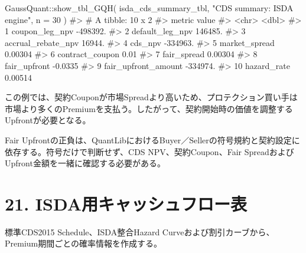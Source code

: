 \documentclass[
  letterpaper,
  DIV=11,
  numbers=noendperiod]{scrreprt}
\newenvironment{Shaded}{\begin{snugshade}}{\end{snugshade}}
\newcommand{\AttributeTok}[1]{\textcolor[rgb]{0.40,0.45,0.13}{#1}}
\newcommand{\CommentTok}[1]{\textcolor[rgb]{0.37,0.37,0.37}{#1}}
\newcommand{\DecValTok}[1]{\textcolor[rgb]{0.68,0.00,0.00}{#1}}
\newcommand{\FunctionTok}[1]{\textcolor[rgb]{0.28,0.35,0.67}{#1}}
\newcommand{\NormalTok}[1]{\textcolor[rgb]{0.00,0.23,0.31}{#1}}
\newcommand{\SpecialCharTok}[1]{\textcolor[rgb]{0.37,0.37,0.37}{#1}}
\newcommand{\StringTok}[1]{\textcolor[rgb]{0.13,0.47,0.30}{#1}}
\begin{document}
\begin{Shaded}
\begin{Highlighting}[]
\NormalTok{GaussQuant}\SpecialCharTok{::}\FunctionTok{show\_tbl\_GQH}\NormalTok{(}
\NormalTok{  isda\_cds\_summary\_tbl,}
  \StringTok{"CDS summary: ISDA engine"}\NormalTok{,}
  \AttributeTok{n =} \DecValTok{30}
\NormalTok{)}
\CommentTok{\#\textgreater{} \# A tibble: 10 x 2}
\CommentTok{\#\textgreater{}    metric                      value}
\CommentTok{\#\textgreater{}    \textless{}chr\textgreater{}                       \textless{}dbl\textgreater{}}
\CommentTok{\#\textgreater{}  1 coupon\_leg\_npv      {-}498392.     }
\CommentTok{\#\textgreater{}  2 default\_leg\_npv      146485.     }
\CommentTok{\#\textgreater{}  3 accrual\_rebate\_npv    16944.     }
\CommentTok{\#\textgreater{}  4 cds\_npv             {-}334963.     }
\CommentTok{\#\textgreater{}  5 market\_spread             0.00304}
\CommentTok{\#\textgreater{}  6 contract\_coupon           0.01   }
\CommentTok{\#\textgreater{}  7 fair\_spread               0.00304}
\CommentTok{\#\textgreater{}  8 fair\_upfront             {-}0.0335 }
\CommentTok{\#\textgreater{}  9 fair\_upfront\_amount {-}334974.     }
\CommentTok{\#\textgreater{} 10 hazard\_rate               0.00514}
\end{Highlighting}
\end{Shaded}

この例では、契約Couponが市場Spreadより高いため、プロテクション買い手は市場より多くのPremiumを支払う。したがって、契約開始時の価値を調整するUpfrontが必要となる。

Fair
Upfrontの正負は、QuantLibにおけるBuyer／Sellerの符号規約と契約設定に依存する。符号だけで判断せず、CDS
NPV、契約Coupon、Fair
SpreadおよびUpfront金額を一緒に確認する必要がある。

\section{21.
ISDA用キャッシュフロー表}\label{isdaux7528ux30adux30e3ux30c3ux30b7ux30e5ux30d5ux30edux30fcux8868}

標準CDS2015 Schedule、ISDA整合Hazard
Curveおよび割引カーブから、Premium期間ごとの確率情報を作成する。
\end{document}
